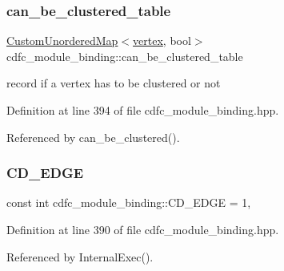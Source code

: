 \subsubsection{\texorpdfstring{can\+\_\+be\+\_\+clustered\+\_\+table}{can\_be\_clustered\_table}}
{\footnotesize\ttfamily \hyperlink{custom__map_8hpp_ad1ed68f2ff093683ab1a33522b144adc}{Custom\+Unordered\+Map}$<$\hyperlink{graph_8hpp_abefdcf0544e601805af44eca032cca14}{vertex}, bool$>$ cdfc\+\_\+module\+\_\+binding\+::can\+\_\+be\+\_\+clustered\+\_\+table\hspace{0.3cm}{\ttfamily [protected]}}



record if a vertex has to be clustered or not 



Definition at line 394 of file cdfc\+\_\+module\+\_\+binding.\+hpp.



Referenced by can\+\_\+be\+\_\+clustered().

\mbox{\label{classcdfc__module__binding_a933e5ed93d35dada40ecd3d52757ee2e}} 
\subsubsection{\texorpdfstring{C\+D\+\_\+\+E\+D\+GE}{CD\_EDGE}}
{\footnotesize\ttfamily const int cdfc\+\_\+module\+\_\+binding\+::\+C\+D\+\_\+\+E\+D\+GE = 1\hspace{0.3cm}{\ttfamily [static]}, {\ttfamily [protected]}}



Definition at line 390 of file cdfc\+\_\+module\+\_\+binding.\+hpp.



Referenced by Internal\+Exec().

\mbox{\label{classcdfc__module__binding_adde868d130c8198336889bac652850c5}} 
